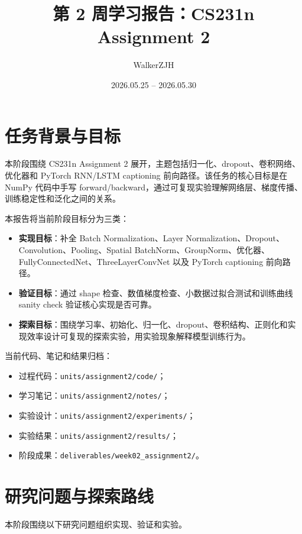 \documentclass[UTF8]{ctexart}
\title{第 2 周学习报告：CS231n Assignment 2}
\author{WalkerZJH}
\date{2026.05.25 -- 2026.05.30}
\begin{document}
\maketitle

\section{任务背景与目标}

本阶段围绕 CS231n Assignment 2 展开，主题包括归一化、dropout、卷积网络、优化器和 PyTorch RNN/LSTM captioning 前向路径。该任务的核心目标是在 NumPy 代码中手写 forward/backward，通过可复现实验理解网络层、梯度传播、训练稳定性和泛化之间的关系。

本报告将当前阶段目标分为三类：
\begin{itemize}
  \item \textbf{实现目标}：补全 Batch Normalization、Layer Normalization、Dropout、Convolution、Pooling、Spatial BatchNorm、GroupNorm、优化器、FullyConnectedNet、ThreeLayerConvNet 以及 PyTorch captioning 前向路径。
  \item \textbf{验证目标}：通过 shape 检查、数值梯度检查、小数据过拟合测试和训练曲线 sanity check 验证核心实现是否可靠。
  \item \textbf{探索目标}：围绕学习率、初始化、归一化、dropout、卷积结构、正则化和实现效率设计可复现的探索实验，用实验现象解释模型训练行为。
\end{itemize}

当前代码、笔记和结果归档：
\begin{itemize}
  \item 过程代码：\texttt{units/assignment2/code/}；
  \item 学习笔记：\texttt{units/assignment2/notes/}；
  \item 实验设计：\texttt{units/assignment2/experiments/}；
  \item 实验结果：\texttt{units/assignment2/results/}；
  \item 阶段成果：\texttt{deliverables/week02\_assignment2/}。
\end{itemize}

\section{研究问题与探索路线}

本阶段围绕以下研究问题组织实现、验证和实验。
\end{document}
